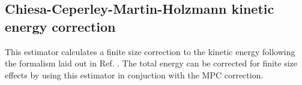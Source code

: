 



\subsection{Chiesa-Ceperley-Martin-Holzmann kinetic energy correction}

This estimator calculates a finite size correction to the kinetic energy following the formalism laid out in Ref. \cite{Chiesa2006}.  The total energy can be corrected for finite size effects by using this estimator in conjuction with the MPC correction.

